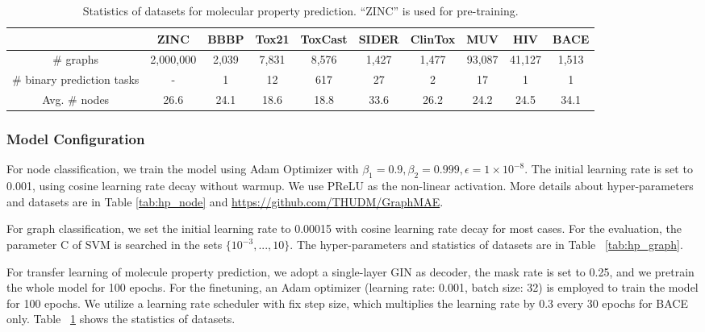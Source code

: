 \begin{table}[htbp]
    \centering
    \renewcommand\arraystretch{1.05}
    \caption{Statistics of datasets for molecular property prediction. ``ZINC'' is used for pre-training.}
    \begin{tabular}{@{}c|ccccccccc}  
        \toprule[1.2pt]
                      & ZINC & BBBP & Tox21 & ToxCast & SIDER & ClinTox & MUV & HIV & BACE \\
        \midrule
        \# graphs      & 2,000,000 & 2,039 & 7,831 & 8,576 & 1,427 & 1,477 & 93,087 & 41,127 & 1,513\\     
        \# binary prediction tasks     & - & 1 & 12 & 617 & 27 & 2 & 17 & 1 & 1   \\            
        Avg. \# nodes  & 26.6 & 24.1 & 18.6 & 18.8 &  33.6 & 26.2 & 24.2 & 24.5 & 34.1 \\ 
        \bottomrule[1.2pt]
    \end{tabular}
    \label{tab:stat_mol}
\end{table}



\subsubsection{Model Configuration}
For node classification, we train the model using Adam Optimizer with $\beta_1 = 0.9, \beta_2 = 0.999, \epsilon = 1 \times 10^{-8}$. The initial learning rate is set to 0.001, using cosine learning rate decay without warmup. We use PReLU as the non-linear activation. More details about hyper-parameters and datasets are in Table \ref{tab:hp_node} and \url{https://github.com/THUDM/GraphMAE}.

For graph classification, we set the initial learning rate to 0.00015 with cosine learning rate decay for most cases. For the evaluation,  the parameter C of SVM is searched in the sets $\{10^{-3},...,10\}$. The hyper-parameters and statistics of datasets are in Table ~\ref{tab:hp_graph}.

For transfer learning of molecule property prediction, we adopt a single-layer GIN as decoder, the mask rate is set to 0.25, and we pretrain the whole model for 100 epochs.
For the finetuning, an Adam optimizer (learning rate: 0.001, batch size: 32) is employed to train the model for 100 epochs. We utilize a learning rate scheduler with fix step size, which multiplies the learning rate by 0.3 every 30 epochs for BACE only. Table ~\ref{tab:stat_mol} shows the statistics of datasets.


